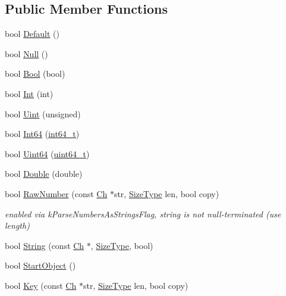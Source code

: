 \subsection*{Public Member Functions}
\begin{DoxyCompactItemize}
\item 
bool \hyperlink{structBaseReaderHandler_a836437f6ccc37f08ff933f009b18a78c}{Default} ()
\item 
bool \hyperlink{structBaseReaderHandler_ae2ebbde4628bf3659ddc5d18520935f5}{Null} ()
\item 
bool \hyperlink{structBaseReaderHandler_aa1c3ce42dbb856b3349792dc9d963587}{Bool} (bool)
\item 
bool \hyperlink{structBaseReaderHandler_a85e813aaf7189a2f87bd53953324fafc}{Int} (int)
\item 
bool \hyperlink{structBaseReaderHandler_a0e683306cbb7b4e350a35c18c5246f2a}{Uint} (unsigned)
\item 
bool \hyperlink{structBaseReaderHandler_a04011733ea584739c97ad5c6afa15a35}{Int64} (\hyperlink{stdint_8h_a414156feea104f8f75b4ed9e3121b2f6}{int64\+\_\+t})
\item 
bool \hyperlink{structBaseReaderHandler_a351aa3cd81856a487c21022e9cc64d2b}{Uint64} (\hyperlink{stdint_8h_aec6fcb673ff035718c238c8c9d544c47}{uint64\+\_\+t})
\item 
bool \hyperlink{structBaseReaderHandler_a8156ea6ae5b8cd23a8b700e92a8af1eb}{Double} (double)
\item 
bool \hyperlink{structBaseReaderHandler_a9ed0d83d5e6c8f5e4b32ca3735ff0bb7}{Raw\+Number} (const \hyperlink{structBaseReaderHandler_a8302c755dd3560c8c5bac99162c28214}{Ch} $\ast$str, \hyperlink{rapidjson_8h_a5ed6e6e67250fadbd041127e6386dcb5}{Size\+Type} len, bool copy)
\begin{DoxyCompactList}\small\item\em enabled via k\+Parse\+Numbers\+As\+Strings\+Flag, string is not null-\/terminated (use length) \end{DoxyCompactList}\item 
bool \hyperlink{structBaseReaderHandler_a3ac69e6326d0aeef7b1f2619742bbe00}{String} (const \hyperlink{structBaseReaderHandler_a8302c755dd3560c8c5bac99162c28214}{Ch} $\ast$, \hyperlink{rapidjson_8h_a5ed6e6e67250fadbd041127e6386dcb5}{Size\+Type}, bool)
\item 
bool \hyperlink{structBaseReaderHandler_ab0a7d9bcececb8d6ed748656f67f4917}{Start\+Object} ()
\item 
bool \hyperlink{structBaseReaderHandler_abc50b2e7e411b7b731715e05cd01e2eb}{Key} (const \hyperlink{structBaseReaderHandler_a8302c755dd3560c8c5bac99162c28214}{Ch} $\ast$str, \hyperlink{rapidjson_8h_a5ed6e6e67250fadbd041127e6386dcb5}{Size\+Type} len, bool copy)

\end{DoxyCompactItemize}
